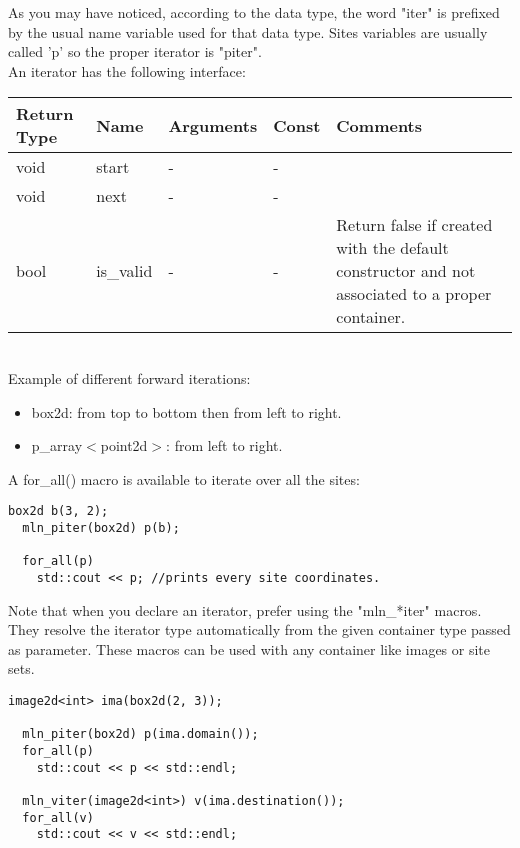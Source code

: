 \documentclass{report}
\begin{document}
As you may have noticed, according to the data type, the word "iter" is prefixed
by the usual name variable used for that data type. Sites variables are usually
called 'p' so the proper iterator is "piter".\\


An iterator has the following interface: \\

\begin{tabular}{|l|l|l|l|p{4cm}|}
\hline
Return Type & Name & Arguments & Const & Comments \\ \hline

void & start & - & - & \\ \hline
void & next & - & - & \\ \hline
bool & is\_valid & - & - & Return false if created with the default
constructor and not associated to a proper container.\\ \hline
\end{tabular} \\


Example of different forward iterations:
\begin{itemize}
  \item box2d: from top to bottom then from left to right.
  \item p\_array$<$point2d$>$: from left to right.
\end{itemize}

A for\_all() macro is available to iterate over all the sites: \\

\begin{lstlisting}[frame=single]
  box2d b(3, 2);
  mln_piter(box2d) p(b);

  for_all(p)
    std::cout << p; //prints every site coordinates.
\end{lstlisting}

Note that when you declare an iterator, prefer using the "mln\_*iter" macros.
They resolve the iterator type automatically from the given container type
passed as parameter. These macros can be used with any container like images or
site sets.

\begin{lstlisting}[frame=single]
  image2d<int> ima(box2d(2, 3));

  mln_piter(box2d) p(ima.domain());
  for_all(p)
    std::cout << p << std::endl;

  mln_viter(image2d<int>) v(ima.destination());
  for_all(v)
    std::cout << v << std::endl;
\end{lstlisting}
\end{document}
